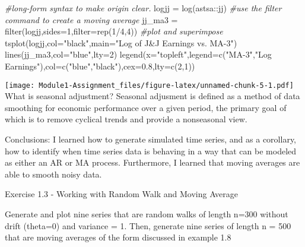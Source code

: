 \documentclass[
]{article}
\newenvironment{Shaded}{\begin{snugshade}}{\end{snugshade}}
\newcommand{\AttributeTok}[1]{\textcolor[rgb]{0.77,0.63,0.00}{#1}}
\newcommand{\CommentTok}[1]{\textcolor[rgb]{0.56,0.35,0.01}{\textit{#1}}}
\newcommand{\DecValTok}[1]{\textcolor[rgb]{0.00,0.00,0.81}{#1}}
\newcommand{\FloatTok}[1]{\textcolor[rgb]{0.00,0.00,0.81}{#1}}
\newcommand{\FunctionTok}[1]{\textcolor[rgb]{0.00,0.00,0.00}{#1}}
\newcommand{\NormalTok}[1]{#1}
\newcommand{\OtherTok}[1]{\textcolor[rgb]{0.56,0.35,0.01}{#1}}
\newcommand{\SpecialCharTok}[1]{\textcolor[rgb]{0.00,0.00,0.00}{#1}}
\newcommand{\StringTok}[1]{\textcolor[rgb]{0.31,0.60,0.02}{#1}}
\begin{document}
\begin{Shaded}
\begin{Highlighting}[]
\CommentTok{\#long{-}form syntax to make origin clear.}
\NormalTok{logjj }\OtherTok{=} \FunctionTok{log}\NormalTok{(astsa}\SpecialCharTok{::}\NormalTok{jj)}
\CommentTok{\#use the filter command to create a moving average}
\NormalTok{jj\_ma3 }\OtherTok{=} \FunctionTok{filter}\NormalTok{(logjj,}\AttributeTok{sides=}\DecValTok{1}\NormalTok{,}\AttributeTok{filter=}\FunctionTok{rep}\NormalTok{(}\DecValTok{1}\SpecialCharTok{/}\DecValTok{4}\NormalTok{,}\DecValTok{4}\NormalTok{))}
\CommentTok{\#plot and superimpose}
\FunctionTok{tsplot}\NormalTok{(logjj,}\AttributeTok{col=}\StringTok{"black"}\NormalTok{,}\AttributeTok{main=}\StringTok{"Log of J\&J Earnings vs. MA{-}3"}\NormalTok{)}
\FunctionTok{lines}\NormalTok{(jj\_ma3,}\AttributeTok{col=}\StringTok{"blue"}\NormalTok{,}\AttributeTok{lty=}\DecValTok{2}\NormalTok{)}
\FunctionTok{legend}\NormalTok{(}\AttributeTok{x=}\StringTok{"topleft"}\NormalTok{,}\AttributeTok{legend=}\FunctionTok{c}\NormalTok{(}\StringTok{"MA{-}3"}\NormalTok{,}\StringTok{"Log Earnings"}\NormalTok{),}\AttributeTok{col=}\FunctionTok{c}\NormalTok{(}\StringTok{"blue"}\NormalTok{,}\StringTok{"black"}\NormalTok{),}\AttributeTok{cex=}\FloatTok{0.8}\NormalTok{,}\AttributeTok{lty=}\FunctionTok{c}\NormalTok{(}\DecValTok{2}\NormalTok{,}\DecValTok{1}\NormalTok{))}
\end{Highlighting}
\end{Shaded}

\texttt{[image: Module1-Assignment\_files/figure-latex/unnamed-chunk-5-1.pdf]}
What is seasonal adjustment? Seasonal adjusment is defined as a method
of data smoothing for economic performance over a given period, the
primary goal of which is to remove cyclical trends and provide a
nonseasonal view.

Conclusions: I learned how to generate simulated time series, and as a
corollary, how to identify when time series data is behaving in a way
that can be modeled as either an AR or MA process. Furthermore, I
learned that moving averages are able to smooth noisy data.

Exercise 1.3 - Working with Random Walk and Moving Average

Generate and plot nine series that are random walks of length n=300
without drift (theta=0) and variance = 1. Then, generate nine series of
length n = 500 that are moving averages of the form discussed in example
1.8
\end{document}
